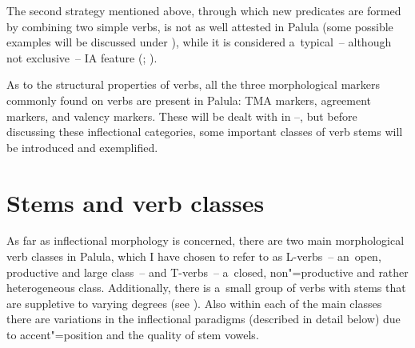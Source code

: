 The second strategy mentioned above, through which new predicates are formed by combining two simple verbs, is not as well attested in Palula (some possible examples will be discussed under ), while it is considered a~typical~-- although not exclusive~-- IA feature (\citealt[559]{ebert2006}; \citealt[250--252]{masica2001}). 



As to the structural properties of verbs, all the three morphological markers commonly found on verbs \citep[409]{viberg2006} are present in Palula: TMA markers, agreement markers, and valency markers. These will be dealt with in --, but before discussing these inflectional categories, some important classes of verb stems will be introduced and exemplified.


\section{Stems and verb classes}
\label{sec:8-2}


As far as inflectional morphology is concerned, there are two main morphological verb classes in Palula, which I have chosen to refer to as L-verbs~-- an~open, productive and large class~-- and T-verbs~-- a~closed, non"=productive and rather heterogeneous class. Additionally, there is a~small group of verbs with stems that are suppletive to varying degrees (see ). Also within each of the main classes there are variations in the inflectional paradigms (described in detail below) due to accent"=position and the quality of stem vowels.


